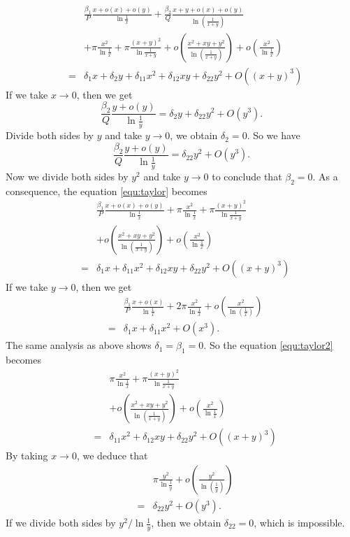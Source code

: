 \documentclass[11pt]{amsart}
\theoremstyle{plain}
\begin{document}
\begin{eqnarray}\label{equ:taylor}
 &&  \frac{\beta_1}{P} \frac{x+o(x)+o(y)}{\ln \frac{1}{x}} +\frac{\beta_2 }{Q} \frac{x+y+o(x)+o(y)}{\ln \left(\frac{1}{x+y}\right)} \nonumber \\
    && + \pi \frac{x^2}{\ln \frac{1}{x}}+\pi \frac{\left(x+y \right)^2}{\ln \frac{1}{x+y}} 
    +o\left(\frac{x^2+xy+y^2}{\ln \left(\frac{1}{x+y}\right)}\right)+o\left(\frac{x^2}{\ln \frac{1}{x}}\right) \\
   &=& \delta_{1}x +\delta_{2}y + \delta_{11}x^2 + \delta_{12}xy + \delta_{22}y^2+ O\left((x+y)^3\right)\nonumber
\end{eqnarray}
If we take $x\to 0$, then we get 
$$\frac{\beta_2}{Q}\frac{y+o(y)}{\ln \frac{1}{y}}=\delta_2 y + \delta_{22}y^2+O\left(y^3\right).$$
Divide both sides by $y$ and take $y\to 0$, we obtain $\delta_2=0$. So we have 
$$\frac{\beta_2}{Q}\frac{y+o(y)}{\ln \frac{1}{y}}= \delta_{22}y^2+O\left(y^3\right).$$
Now we divide both sides by $y^2$ and take $y\to 0$ to conclude that $\beta_2=0$. 
As a consequence, the equation \eqref{equ:taylor} becomes 
\begin{eqnarray}\label{equ:taylor2}
 &&  \frac{\beta_1}{P} \frac{x+o(x)+o(y)}{\ln \frac{1}{x}} 
    + \pi \frac{x^2}{\ln \frac{1}{x}}+\pi \frac{\left(x+y \right)^2}{\ln \frac{1}{x+y}} \nonumber \\
     && +o\left(\frac{x^2+xy+y^2}{\ln \left(\frac{1}{x+y}\right)}\right)+o\left(\frac{x^2}{\ln \frac{1}{x}}\right) \\
   &=& \delta_{1}x + \delta_{11}x^2 + \delta_{12}xy + \delta_{22}y^2+ O\left((x+y)^3\right)\nonumber
\end{eqnarray}
If we take $y\to 0$, then we get 
\begin{eqnarray*}
 &&  \frac{\beta_1}{P} \frac{x+o(x)}{\ln \frac{1}{x}} 
    + 2\pi \frac{x^2}{\ln \frac{1}{x}}
     +o\left(\frac{x^2}{\ln \left(\frac{1}{x}\right)}\right) \\
   &=& \delta_{1}x + \delta_{11}x^2 + O\left(x^3\right).
\end{eqnarray*}
The same analysis as above shows  $\delta_1=\beta_1=0$. So the equation \eqref{equ:taylor2}
becomes 
\begin{eqnarray*}
 && \pi \frac{x^2}{\ln \frac{1}{x}}+\pi \frac{\left(x+y \right)^2}{\ln \frac{1}{x+y}} \nonumber \\
     && +o\left(\frac{x^2+xy+y^2}{\ln \left(\frac{1}{x+y}\right)}\right)+o\left(\frac{x^2}{\ln \frac{1}{x}}\right) \\
   &=&  \delta_{11}x^2 + \delta_{12}xy + \delta_{22}y^2+ O\left((x+y)^3\right)\nonumber
\end{eqnarray*}
By taking $x\to 0$, we deduce that  
\begin{eqnarray*}
 && \pi \frac{y^2}{\ln \frac{1}{y}} +o\left(\frac{y^2}{\ln \left(\frac{1}{y}\right)}\right) \\
   &=&  \delta_{22}y^2+ O\left(y^3\right).
\end{eqnarray*}
If we divide both sides  by $y^2/\ln \frac{1}{y}$, then we obtain $\delta_{22}=0$,
which is impossible. 
\end{document}
